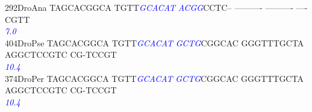 \documentclass[11pt,twoside,reqno,a4paper]{article}
\begin{document}
{292\hspace*{1\charwidth}DroAna	TAGCACGGCA	TGTT\textit{\textcolor{Blue}{G}}\textit{\textcolor{Blue}{C}}\textit{\textcolor{Blue}{A}}\textit{\textcolor{Blue}{C}}\textit{\textcolor{Blue}{A}}\textit{\textcolor{Blue}{T}}	\textit{\textcolor{Blue}{A}}\textit{\textcolor{Blue}{C}}\textit{\textcolor{Blue}{G}}\textit{\textcolor{Blue}{G}}CCTC--	----------	----------	----CGTT\\
\hspace*{4\charwidth}\hspace*{7\charwidth}\hspace*{1\charwidth}\hspace*{14\charwidth}\textit{\textcolor{Blue}{7.0}}\hspace*{1\charwidth}\hspace*{1\charwidth}\hspace*{1\charwidth}\hspace*{1\charwidth}\\
404\hspace*{1\charwidth}DroPse	TAGCACGGCA	TGTT\textit{\textcolor{Blue}{G}}\textit{\textcolor{Blue}{C}}\textit{\textcolor{Blue}{A}}\textit{\textcolor{Blue}{C}}\textit{\textcolor{Blue}{A}}\textit{\textcolor{Blue}{T}}	\textit{\textcolor{Blue}{G}}\textit{\textcolor{Blue}{C}}\textit{\textcolor{Blue}{T}}\textit{\textcolor{Blue}{G}}CGGCAC	GGGTTTGCTA	AGGCTCCGTC	CG-TCCGT\\
\hspace*{4\charwidth}\hspace*{7\charwidth}\hspace*{1\charwidth}\hspace*{14\charwidth}\textit{\textcolor{Blue}{10.4}}\hspace*{1\charwidth}\hspace*{1\charwidth}\hspace*{1\charwidth}\hspace*{1\charwidth}\\
374\hspace*{1\charwidth}DroPer	TAGCACGGCA	TGTT\textit{\textcolor{Blue}{G}}\textit{\textcolor{Blue}{C}}\textit{\textcolor{Blue}{A}}\textit{\textcolor{Blue}{C}}\textit{\textcolor{Blue}{A}}\textit{\textcolor{Blue}{T}}	\textit{\textcolor{Blue}{G}}\textit{\textcolor{Blue}{C}}\textit{\textcolor{Blue}{T}}\textit{\textcolor{Blue}{G}}CGGCAC	GGGTTTGCTA	AGGCTCCGTC	CG-TCCGT\\
\hspace*{4\charwidth}\hspace*{7\charwidth}\hspace*{1\charwidth}\hspace*{14\charwidth}\textit{\textcolor{Blue}{10.4}}\hspace*{1\charwidth}\hspace*{1\charwidth}\hspace*{1\charwidth}\hspace*{1\charwidth}\\
}
\end{document}
